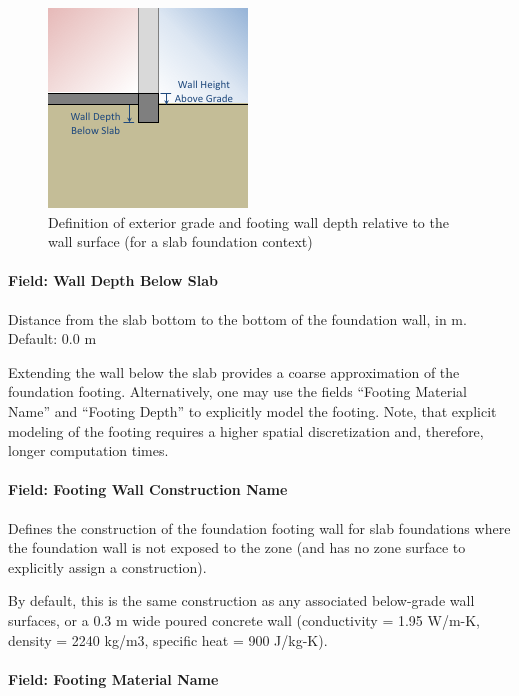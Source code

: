 \begin{figure}
\centering
\includegraphics{media/kiva-2d-wall-slab.png}
\caption{Definition of exterior grade and footing wall depth relative to
the wall surface (for a slab foundation context)\label{fig:2d-w-slab}}
\end{figure}

\paragraph{Field: Wall Depth Below
Slab}

Distance from the slab bottom to the bottom of the foundation wall, in
m. Default: 0.0 m

Extending the wall below the slab provides a coarse approximation of the
foundation footing. Alternatively, one may use the fields ``Footing
Material Name'' and ``Footing Depth'' to explicitly model the footing.
Note, that explicit modeling of the footing requires a higher spatial
discretization and, therefore, longer computation times.

\paragraph{Field: Footing Wall Construction
Name}

Defines the construction of the foundation footing wall for slab foundations where the foundation wall is not exposed
to the zone (and has no zone surface to explicitly assign a
construction).

By default, this is the same construction as any associated below-grade
wall surfaces, or a 0.3 m wide poured concrete wall (conductivity = 1.95
W/m-K, density = 2240 kg/m3, specific heat = 900 J/kg-K).

\paragraph{Field: Footing Material
Name}

